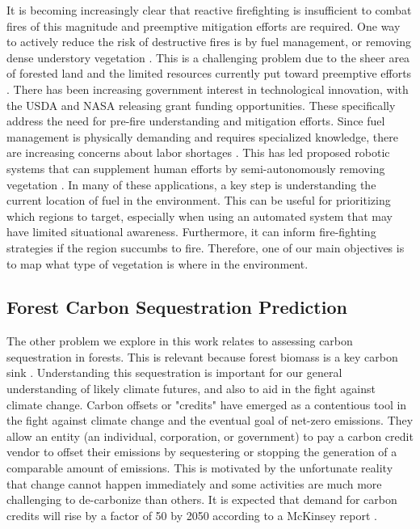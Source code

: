 It is becoming increasingly clear that reactive firefighting is insufficient to combat fires of this magnitude and preemptive mitigation efforts are required. One way to actively reduce the risk of destructive fires is by fuel management, or removing dense understory vegetation \cite{Fire2021FuelsManagement, WildlandFireResiliencyProgram20214Plan, Agriculture2019HazardousComplex}. This is a challenging problem due to the sheer area of forested land and the limited resources currently put toward preemptive efforts \cite{spreading_like_wildfire}.
There has been increasing government interest in technological innovation, with the USDA \cite{USDA2023USDAGrant} and NASA \cite{SPSO2023Research2023} releasing grant funding opportunities. These specifically address the need for pre-fire understanding and mitigation efforts. 
Since fuel management is physically demanding and requires specialized knowledge, there are increasing concerns about labor shortages \cite{CommisionGlobalDivision}. This has led proposed robotic systems that can supplement human efforts by semi-autonomously removing vegetation \cite{couceiro2019semfire}. In many of these applications, a key step is understanding the current location of fuel in the environment. This can be useful for prioritizing which regions to target, especially when using an automated system that may have limited situational awareness. Furthermore, it can inform fire-fighting strategies if the region succumbs to fire. Therefore, one of our main objectives is to map what type of vegetation is where in the environment.

\subsection{Forest Carbon Sequestration Prediction}
The other problem we explore in this work relates to assessing carbon sequestration in forests. This is relevant because forest biomass is a key carbon sink \cite{Griscom2017NaturalSolutions}. Understanding this sequestration is important for our general understanding of likely climate futures, and also to aid in the fight against climate change. Carbon offsets or "credits" have emerged as a contentious tool in the fight against climate change and the eventual goal of net-zero emissions. They allow an entity (an individual, corporation, or government) to pay a carbon credit vendor to offset their emissions by sequestering or stopping the generation of a comparable amount of emissions. This is motivated by the unfortunate reality that change cannot happen immediately and some activities are much more challenging to de-carbonize than others. It is expected that demand for carbon credits will rise by a factor of 50 by 2050 according to a McKinsey report \cite{Blaufelder2021AChallenge}. 

